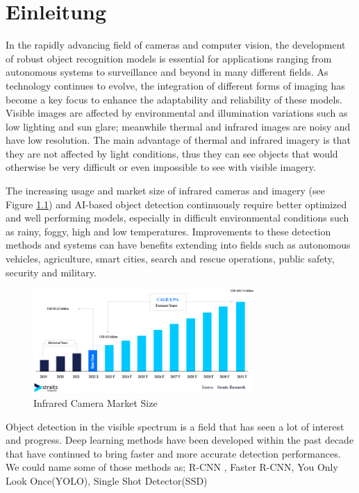 \chapter{Einleitung}
\label{cha:Einleitung}

In the rapidly advancing field of cameras and computer vision, the development of robust object recognition models is essential for applications ranging from autonomous systems to surveillance and beyond in many different fields. As technology continues to evolve, the integration of different forms of imaging has become a key focus to enhance the adaptability and reliability of these models. Visible images are affected by environmental and illumination variations such as low lighting and sun glare; meanwhile thermal and infrared images are noisy and have low resolution. \cite[p.1]{SystematicReview23} The main advantage of thermal and infrared imagery is that they are not affected by light conditions, thus they can see objects that would otherwise be very difficult or even impossible to see with visible imagery.

The increasing usage and market size of infrared cameras and imagery (see Figure \ref{fig:marketsize}) and AI-based object detection continuously require better optimized and well performing models, especially in difficult environmental conditions such as rainy, foggy, high and low temperatures. Improvements to these detection methods and systems can have benefits extending into fields such as autonomous vehicles, agriculture, smart cities, search and rescue operations, public safety, security and military. 

\begin{figure}[!ht]
	\centering
		\includegraphics[width=0.75\textwidth]{images/straitsresearch_infrared_camera_marketsize.png}
	\caption{Infrared Camera Market Size \citep{InfraredCameraMarket}}
	\label{fig:marketsize}
\end{figure}

Object detection in the visible spectrum is a field that has seen a lot of interest and progress. Deep learning methods have been developed within the past decade that have continued to bring faster and more accurate detection performances. We could name some of those methods as; R-CNN \citep{girshick2014rcnn}, Faster R-CNN, You Only Look Once(YOLO), Single Shot Detector(SSD)

